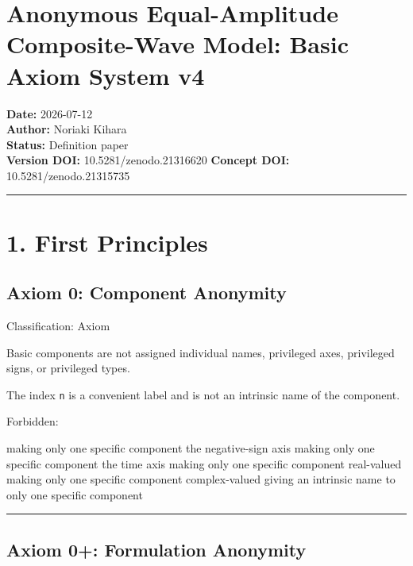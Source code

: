 \documentclass[
  a4paper,
]{article}
\author{}
\date{}
\newenvironment{Shaded}{}{}
\newcommand{\NormalTok}[1]{#1}
\begin{document}
\section{Anonymous Equal-Amplitude Composite-Wave Model: Basic Axiom
System
v4}\label{anonymous-equal-amplitude-composite-wave-model-basic-axiom-system-v4}

\textbf{Date:} 2026-07-12\\
\textbf{Author:} Noriaki Kihara\\
\textbf{Status:} Definition paper\\
\textbf{Version DOI:} 10.5281/zenodo.21316620 \textbf{Concept DOI:}
10.5281/zenodo.21315735

\begin{center}\rule{0.5\linewidth}{0.5pt}\end{center}

\section{1. First Principles}\label{first-principles}

\subsection{Axiom 0: Component
Anonymity}\label{axiom-0-component-anonymity}

Classification: Axiom

Basic components are not assigned individual names, privileged axes,
privileged signs, or privileged types.

The index \texttt{n} is a convenient label and is not an intrinsic name
of the component.

Forbidden:

\begin{Shaded}
\begin{Highlighting}[]
\NormalTok{making only one specific component the negative{-}sign axis}
\NormalTok{making only one specific component the time axis}
\NormalTok{making only one specific component real{-}valued}
\NormalTok{making only one specific component complex{-}valued}
\NormalTok{giving an intrinsic name to only one specific component}
\end{Highlighting}
\end{Shaded}

\begin{center}\rule{0.5\linewidth}{0.5pt}\end{center}

\subsection{Axiom 0+: Formulation
Anonymity}\label{axiom-0-formulation-anonymity}
\end{document}

